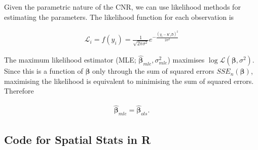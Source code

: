 Given the parametric nature of the CNR, we can use likelihood methods for estimating the parameters. The likelihood function for each observation is

\begin{eqnarray}
\mathcal{L}_{i}  = f(y_{i}) = \frac{1}{\sqrt{2 \pi \sigma^{2}}}e^{-\frac{(y_{i} - \boldsymbol{x}'_{i}\boldsymbol{\beta})^{2}}{2\sigma^{2}}}
\end{eqnarray}

The maximum likelihood estimator (MLE; $\hat{\boldsymbol{\beta}}_{mle}, \sigma^{2}_{mle}$) maximises $\log \mathcal{L}(\boldsymbol{\beta}, \sigma^{2})$. Since this is a function of $\boldsymbol{\beta}$ only through the sum of squared errors $SSE_{n}(\boldsymbol{\beta})$, maximising the likelihood is equivalent to minimising the sum of squared errors. Therefore

\begin{eqnarray}
\hat{\boldsymbol{\beta}}_{mle} = \boldsymbol{\hat{\beta}}_{ols}.
\end{eqnarray}


\begin{subappendices}
\section{Code for Spatial Stats in R}


\renewcommand\bibname{Further reading}



\end{subappendices}
